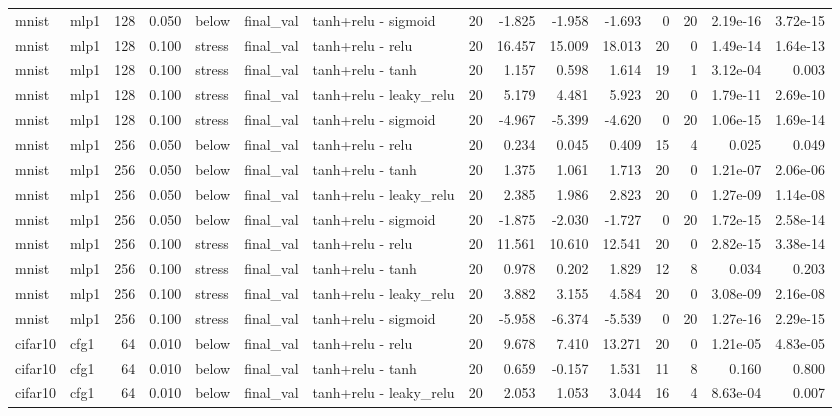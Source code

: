 \begin{table}[htbp]
{\begin{tabular}{@{}llrrlllrrrrrrrr@{}}
mnist & mlp1 & 128 & 0.050 & below & final\_val & tanh+relu - sigmoid & 20 & -1.825 & -1.958 & -1.693 & 0 & 20 & 2.19e-16 & 3.72e-15 \\
mnist & mlp1 & 128 & 0.100 & stress & final\_val & tanh+relu - relu & 20 & 16.457 & 15.009 & 18.013 & 20 & 0 & 1.49e-14 & 1.64e-13 \\
mnist & mlp1 & 128 & 0.100 & stress & final\_val & tanh+relu - tanh & 20 & 1.157 & 0.598 & 1.614 & 19 & 1 & 3.12e-04 & 0.003 \\
mnist & mlp1 & 128 & 0.100 & stress & final\_val & tanh+relu - leaky\_relu & 20 & 5.179 & 4.481 & 5.923 & 20 & 0 & 1.79e-11 & 2.69e-10 \\
mnist & mlp1 & 128 & 0.100 & stress & final\_val & tanh+relu - sigmoid & 20 & -4.967 & -5.399 & -4.620 & 0 & 20 & 1.06e-15 & 1.69e-14 \\
mnist & mlp1 & 256 & 0.050 & below & final\_val & tanh+relu - relu & 20 & 0.234 & 0.045 & 0.409 & 15 & 4 & 0.025 & 0.049 \\
mnist & mlp1 & 256 & 0.050 & below & final\_val & tanh+relu - tanh & 20 & 1.375 & 1.061 & 1.713 & 20 & 0 & 1.21e-07 & 2.06e-06 \\
mnist & mlp1 & 256 & 0.050 & below & final\_val & tanh+relu - leaky\_relu & 20 & 2.385 & 1.986 & 2.823 & 20 & 0 & 1.27e-09 & 1.14e-08 \\
mnist & mlp1 & 256 & 0.050 & below & final\_val & tanh+relu - sigmoid & 20 & -1.875 & -2.030 & -1.727 & 0 & 20 & 1.72e-15 & 2.58e-14 \\
mnist & mlp1 & 256 & 0.100 & stress & final\_val & tanh+relu - relu & 20 & 11.561 & 10.610 & 12.541 & 20 & 0 & 2.82e-15 & 3.38e-14 \\
mnist & mlp1 & 256 & 0.100 & stress & final\_val & tanh+relu - tanh & 20 & 0.978 & 0.202 & 1.829 & 12 & 8 & 0.034 & 0.203 \\
mnist & mlp1 & 256 & 0.100 & stress & final\_val & tanh+relu - leaky\_relu & 20 & 3.882 & 3.155 & 4.584 & 20 & 0 & 3.08e-09 & 2.16e-08 \\
mnist & mlp1 & 256 & 0.100 & stress & final\_val & tanh+relu - sigmoid & 20 & -5.958 & -6.374 & -5.539 & 0 & 20 & 1.27e-16 & 2.29e-15 \\
cifar10 & cfg1 & 64 & 0.010 & below & final\_val & tanh+relu - relu & 20 & 9.678 & 7.410 & 13.271 & 20 & 0 & 1.21e-05 & 4.83e-05 \\
cifar10 & cfg1 & 64 & 0.010 & below & final\_val & tanh+relu - tanh & 20 & 0.659 & -0.157 & 1.531 & 11 & 8 & 0.160 & 0.800 \\
cifar10 & cfg1 & 64 & 0.010 & below & final\_val & tanh+relu - leaky\_relu & 20 & 2.053 & 1.053 & 3.044 & 16 & 4 & 8.63e-04 & 0.007 \\

\end{tabular}}
\end{table}
